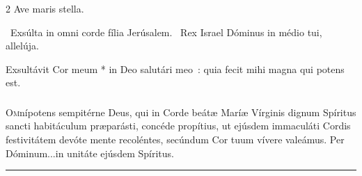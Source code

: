 \documentclass[9pt,twoside]{extarticle}
\begin{document}
\begin{multicols}{2}
{\small {} Ave maris stella. }

~Exsúlta in omni corde fília Jerúsalem. ~Rex Israel Dóminus in médio tui, allelúja.

\normalsize {} Exsultávit Cor meum * in Deo salutári meo~: quia fecit mihi magna qui potens est.

\subsubsection*{\center \normalfont {}}
\lettrine{O}{m}nípotens sempitérne Deus, qui in Corde beátæ Maríæ Vírginis dignum Spíritus sancti habitáculum præparásti, concéde propítius, ut ejúsdem immaculáti Cordis festivitátem devóte mente recoléntes, secúndum Cor tuum vívere valeámus. Per Dóminum...in unitáte ejúsdem Spíritus.

\smallskip 
\small {}
\medskip
\begin{center}\textcolor{red}{\rule{\linewidth}{0.5pt}} \end{center}

\end{multicols}
\end{document}
